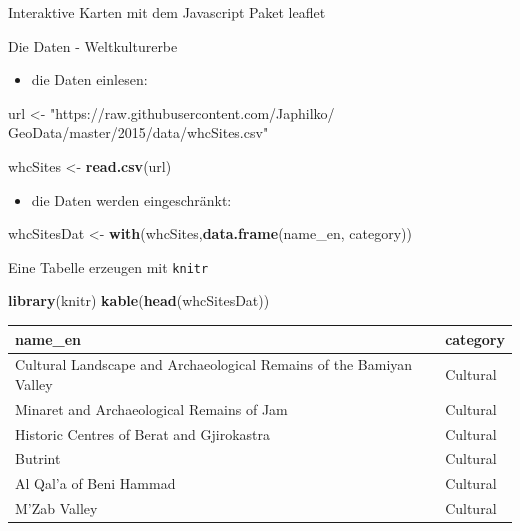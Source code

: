 \documentclass[ignorenonframetext,]{beamer}
\newenvironment{Shaded}{}{}
\newcommand{\KeywordTok}[1]{\textcolor[rgb]{0.00,0.44,0.13}{\textbf{{#1}}}}
\newcommand{\StringTok}[1]{\textcolor[rgb]{0.25,0.44,0.63}{{#1}}}
\newcommand{\NormalTok}[1]{{#1}}
\providecommand{\tightlist}{%
\setlength{\itemsep}{0pt}\setlength{\parskip}{0pt}}
\begin{document}
\begin{frame}{Interaktive Karten mit dem Javascript Paket leaflet}

\end{frame}

\begin{frame}[fragile]{Die Daten - Weltkulturerbe}

\begin{itemize}
\tightlist
\item
  die Daten einlesen:
\end{itemize}

\begin{Shaded}
\begin{Highlighting}[]
\NormalTok{url <-}\StringTok{ "https://raw.githubusercontent.com/Japhilko/}
\StringTok{GeoData/master/2015/data/whcSites.csv"}

\NormalTok{whcSites <-}\StringTok{ }\KeywordTok{read.csv}\NormalTok{(url) }
\end{Highlighting}
\end{Shaded}

\begin{itemize}
\tightlist
\item
  die Daten werden eingeschränkt:
\end{itemize}

\begin{Shaded}
\begin{Highlighting}[]
\NormalTok{whcSitesDat <-}\StringTok{ }\KeywordTok{with}\NormalTok{(whcSites,}\KeywordTok{data.frame}\NormalTok{(name_en,}
                                        \NormalTok{category))}
\end{Highlighting}
\end{Shaded}

\end{frame}

\begin{frame}[fragile]{Eine Tabelle erzeugen mit \texttt{knitr}}

\begin{Shaded}
\begin{Highlighting}[]
\KeywordTok{library}\NormalTok{(knitr)}
\KeywordTok{kable}\NormalTok{(}\KeywordTok{head}\NormalTok{(whcSitesDat))}
\end{Highlighting}
\end{Shaded}

\begin{longtable}[]{@{}ll@{}}
\toprule
name\_en & category\tabularnewline
\midrule
\endhead
Cultural Landscape and Archaeological Remains of the Bamiyan Valley &
Cultural\tabularnewline
Minaret and Archaeological Remains of Jam & Cultural\tabularnewline
Historic Centres of Berat and Gjirokastra & Cultural\tabularnewline
Butrint & Cultural\tabularnewline
Al Qal'a of Beni Hammad & Cultural\tabularnewline
M'Zab Valley & Cultural\tabularnewline
\bottomrule
\end{longtable}

\end{frame}
\end{document}
